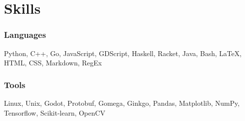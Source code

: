 \section{Skills}

\begin{resumeItem}
\subsubsection{Languages}
Python, C++, Go, JavaScript, GDScript, Haskell, Racket, Java, Bash, {\LaTeX}, HTML, CSS, Markdown, RegEx

\subsubsection{Tools}
Linux, Unix, Godot, Protobuf, Gomega, Ginkgo, Pandas, Matplotlib, NumPy, Tensorflow, Scikit-learn, OpenCV
\end{resumeItem}

